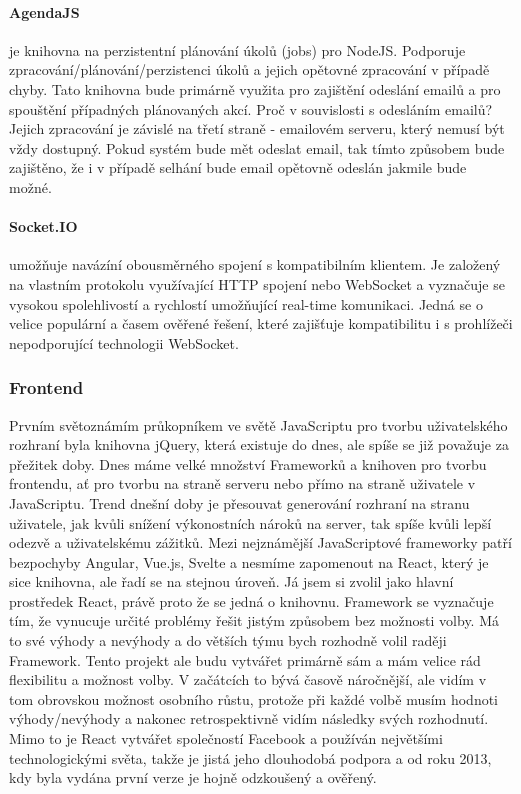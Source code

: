 \paragraph{AgendaJS} je knihovna na perzistentní plánování úkolů (jobs) pro NodeJS. Podporuje zpracování/plánování/perzistenci úkolů a jejich opětovné zpracování v případě chyby. Tato knihovna bude primárně využita pro zajištění odeslání emailů a pro spouštění případných plánovaných akcí. Proč v souvislosti s odesláním emailů? Jejich zpracování je závislé na třetí straně - emailovém serveru, který nemusí být vždy dostupný. Pokud systém bude mět odeslat email, tak tímto způsobem bude zajištěno, že i v případě selhání bude email opětovně odeslán jakmile bude možné.

\paragraph{Socket.IO} umožňuje navázíní obousměrného spojení s kompatibilním klientem. Je založený na vlastním protokolu využívající HTTP spojení nebo WebSocket a vyznačuje se vysokou spolehlivostí a rychlostí umožňující real-time komunikaci. Jedná se o velice populární a časem ověřené řešení, které zajišťuje kompatibilitu i s prohlížeči nepodporující technologii WebSocket.


\subsubsection{Frontend}
Prvním světoznámím průkopníkem ve světě JavaScriptu pro tvorbu uživatelského rozhraní byla knihovna jQuery, která existuje do dnes, ale spíše se již považuje za přežitek doby. Dnes máme velké množství Frameworků a knihoven pro tvorbu frontendu, ať pro tvorbu na straně serveru nebo přímo na straně uživatele v JavaScriptu. Trend dnešní doby je přesouvat generování rozhraní na stranu uživatele, jak kvůli snížení výkonostních nároků na server, tak spíše kvůli lepší odezvě a uživatelskému zážitků. Mezi nejznámější JavaScriptové frameworky patří bezpochyby Angular, Vue.js, Svelte a nesmíme zapomenout na React, který je sice knihovna, ale řadí se na stejnou úroveň. Já jsem si zvolil jako hlavní prostředek React, právě proto že se jedná o knihovnu. Framework se vyznačuje tím, že vynucuje určité problémy řešit jistým způsobem bez možnosti volby. Má to své výhody a nevýhody a do větších týmu bych rozhodně volil raději Framework. Tento projekt ale budu vytvářet primárně sám a mám velice rád flexibilitu a možnost volby. V začátcích to bývá časově náročnější, ale vidím v tom obrovskou možnost osobního růstu, protože při každé volbě musím hodnoti výhody/nevýhody a nakonec retrospektivně vidím následky svých rozhodnutí. Mimo to je React vytvářet společností Facebook a používán největšími technologickými světa, takže je jistá jeho dlouhodobá podpora a od roku 2013, kdy byla vydána první verze je hojně odzkoušený a ověřený.

